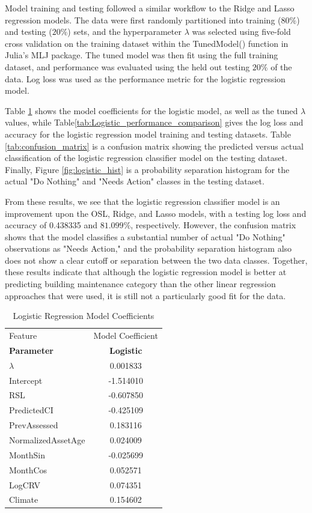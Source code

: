 \documentclass[NewProceedings,letterpaper,NoPageNumbers,NoLineNumbers, DoubleSpace]{ascelike-new}
\begin{document}
Model training and testing followed a similar workflow to the Ridge and Lasso regression models. The data were first randomly partitioned into training ($80\%$) and testing ($20\%$) sets, and the hyperparameter $\lambda$ was selected using five-fold cross validation on the training dataset within the TunedModel() function in Julia's MLJ package. The tuned model was then fit using the full training dataset, and performance was evaluated using the held out testing $20\%$ of the data. Log loss was used as the performance metric for the logistic regression model.

Table \ref{tab:logistic_params} shows the model coefficients for the logistic model, as well as the tuned $\lambda$ values, while Table\ref{tab:Logistic_performance_comparison} gives the log loss and accuracy for the logistic regression model training and testing datasets. Table \ref{tab:confusion_matrix} is a confusion matrix showing the predicted versus actual classification of the logistic regression classifier model on the testing dataset. Finally, Figure \ref{fig:logistic_hist} is a probability separation histogram for the actual "Do Nothing" and "Needs Action" classes in the testing dataset.

From these results, we see that the logistic regression classifier model is an improvement upon the OSL, Ridge, and Lasso models, with a testing log loss and accuracy of 0.438335 and $81.099\%$, respectively. However, the confusion matrix shows that the model classifies a substantial number of actual "Do Nothing" observations as "Needs Action," and the probability separation histogram also does not show a clear cutoff or separation between the two data classes. Together, these results indicate that although the logistic regression model is better at predicting building maintenance category than the other linear regression approaches that were used, it is still not a particularly good fit for the data.

\begin{table}[htbp]
\centering
\caption{Logistic Regression Model Coefficients}
\label{tab:logistic_params}
\begin{tabular}{lc}
\toprule Feature & Model Coefficient \\ 
\textbf{Parameter} & {\textbf{Logistic}} \\
\midrule
$\lambda$          &  0.001833 \\
Intercept          & -1.514010 \\
RSL                & -0.607850 \\
PredictedCI        & -0.425109 \\
PrevAssessed       &  0.183116 \\
NormalizedAssetAge &  0.024009 \\
MonthSin           & -0.025699 \\
MonthCos           &  0.052571 \\
LogCRV             &  0.074351 \\
Climate            &  0.154602 \\
\bottomrule
\end{tabular}
\end{table}
\end{document}
